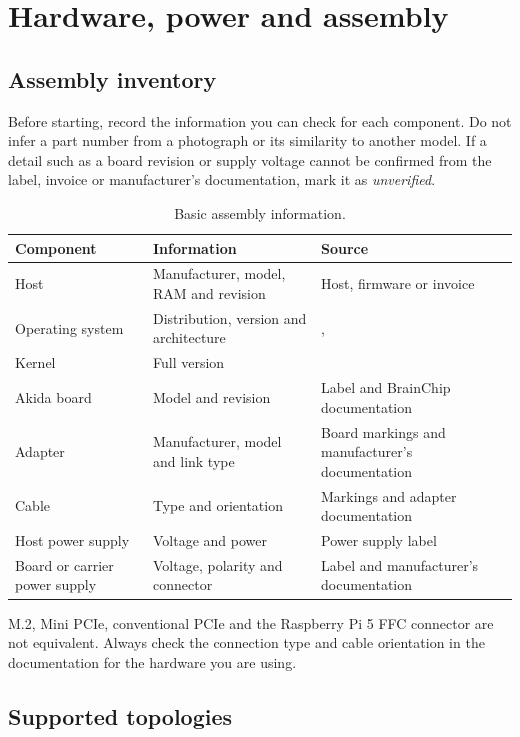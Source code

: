 \chapter{Hardware, power and assembly}
\label{chap:hardware}

\section{Assembly inventory}

Before starting, record the information you can check for each component.
Do not infer a part number from a photograph or its similarity to another model.
If a detail such as a board revision or supply voltage cannot be confirmed from the
label, invoice or manufacturer's documentation, mark it as \emph{unverified}.

\begin{table}[H]
\centering
\caption{Basic assembly information.}
\label{tab:inventario-lector}
\begin{tabularx}{\textwidth}{@{}L{0.28\textwidth}L{0.31\textwidth}Y@{}}
\toprule
\textbf{Component} & \textbf{Information} & \textbf{Source} \\
\midrule
Host & Manufacturer, model, RAM and revision & Host, firmware or invoice \\
Operating system & Distribution, version and architecture & ,  \\
Kernel & Full version &  \\
Akida board & Model and revision & Label and BrainChip documentation \\
Adapter & Manufacturer, model and link type & Board markings and manufacturer's documentation \\
Cable & Type and orientation & Markings and adapter documentation \\
Host power supply & Voltage and power & Power supply label \\
Board or carrier power supply & Voltage, polarity and connector & Label and manufacturer's documentation \\
\bottomrule
\end{tabularx}
\end{table}

M.2, Mini PCIe, conventional PCIe and the Raspberry Pi 5 FFC connector are not
equivalent. Always check the connection type and cable orientation in the documentation
for the hardware you are using.

\section{Supported topologies}


